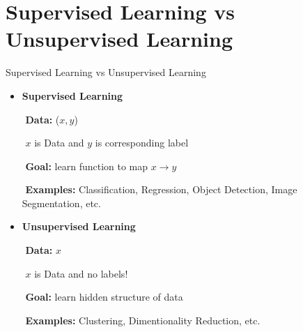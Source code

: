 \section{Supervised Learning vs Unsupervised Learning}


\begin{frame} {Supervised Learning vs Unsupervised Learning }
    \begin{itemize}
    \item \textbf{Supervised Learning}
    \item [$ $] \textbf{Data:} ($x , y$)
    \item [$ $] $x$ is Data and $y$ is corresponding label
    \item [$ $] \textbf{Goal:} learn function to map $x \rightarrow y$
    \item [$ $] \textbf{Examples:} Classification, Regression, Object Detection, Image Segmentation, etc.
    \end{itemize}
    
     \begin{itemize}
    \item \textbf{Unsupervised Learning}
    \item [$ $] \textbf{Data:} $x$
    \item [$ $] $x$ is Data and no labels!
    \item [$ $] \textbf{Goal:} learn hidden structure of data
    \item [$ $] \textbf{Examples:} Clustering, Dimentionality Reduction, etc.
    \end{itemize}

\end{frame}



